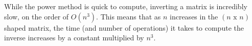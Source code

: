 While the power method is quick to compute, inverting a matrix is incredibly slow, on the order of $O(n^3)$. This means that as $n$ increases in the $(n \text{ x } n)$ shaped matrix, the time (and number of operations) it takes to compute the inverse increases by a constant multiplied by $n^3$.
